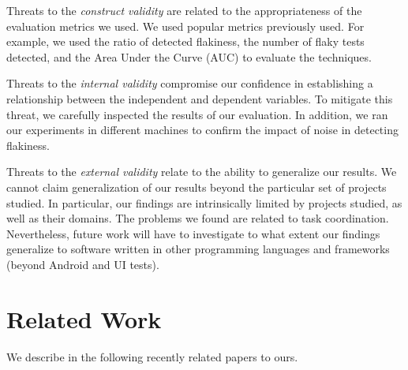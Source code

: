 \documentclass[conference]{IEEEtran}
\begin{document}
Threats to the \emph{construct validity} are related to the appropriateness of the evaluation metrics we used. We used popular metrics previously used. For example, we used the ratio of detected flakiness, the number of flaky tests detected, and the Area Under the Curve (AUC) to evaluate the techniques.  

Threats to the \emph{internal validity} compromise our confidence in establishing a relationship between the independent and dependent variables. 
To mitigate this threat, we carefully inspected the results of our evaluation. In addition, we ran our experiments in different machines to confirm the impact of noise in detecting flakiness. 

Threats to the \emph{external validity} relate to the ability to generalize our results. We cannot claim generalization of our results beyond the particular set of projects studied. In particular, our findings are intrinsically limited by projects studied, as well as their domains. 
The problems we found are related to task coordination. Nevertheless, future work will have to investigate to what extent our findings generalize to software written in other programming languages and frameworks (beyond Android and UI tests).


\section{Related Work}
\label{sec:related}
\label{sec:relatedwork}


We describe in the following recently related papers to ours.
\end{document}
